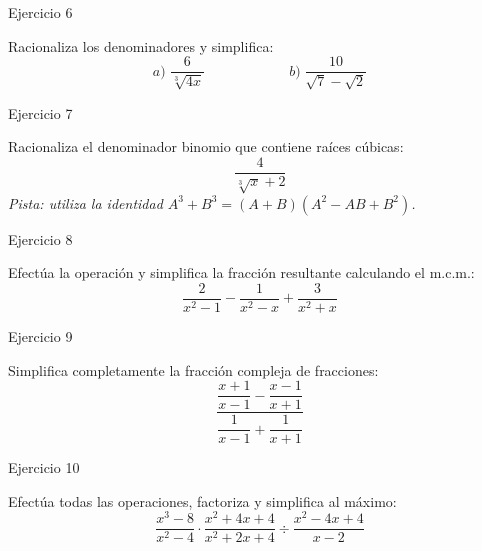 \documentclass[aspectratio=169]{beamer}
\begin{document}
\begin{frame}{Ejercicio 6}
  \begin{mwejercicio}
    Racionaliza los denominadores y simplifica:
    $$a)\; \frac{6}{\sqrt[3]{4x}} \qquad\qquad\qquad b)\; \frac{10}{\sqrt{7} - \sqrt{2}}$$
  \end{mwejercicio}
  \vspace{3.5cm}
\end{frame}
\begin{frame}{Ejercicio 7}
  \begin{mwejercicio}
    Racionaliza el denominador binomio que contiene raíces cúbicas:
    $$\frac{4}{\sqrt[3]{x} + 2}$$
    \emph{Pista: utiliza la identidad $A^3 + B^3 = (A + B)(A^2 - AB + B^2)$.}
  \end{mwejercicio}
  \vspace{3.5cm}
\end{frame}
\begin{frame}{Ejercicio 8}
  \begin{mwejercicio}
    Efectúa la operación y simplifica la fracción resultante calculando el m.c.m.:
    $$\frac{2}{x^2 - 1} - \frac{1}{x^2 - x} + \frac{3}{x^2 + x}$$
  \end{mwejercicio}
  \vspace{3.5cm}
\end{frame}
\begin{frame}{Ejercicio 9}
  \begin{mwejercicio}
    Simplifica completamente la fracción compleja de fracciones:
    $$\frac{\dfrac{x + 1}{x - 1} - \dfrac{x - 1}{x + 1}}{\dfrac{1}{x - 1} + \dfrac{1}{x + 1}}$$
  \end{mwejercicio}
  \vspace{3.5cm}
\end{frame}
\begin{frame}{Ejercicio 10}
  \begin{mwejercicio}
    Efectúa todas las operaciones, factoriza y simplifica al máximo:
    $$\frac{x^3 - 8}{x^2 - 4} \cdot \frac{x^2 + 4x + 4}{x^2 + 2x + 4} \div \frac{x^2 - 4x + 4}{x - 2}$$
  \end{mwejercicio}
  \vspace{3.5cm}
\end{frame}
\end{document}
